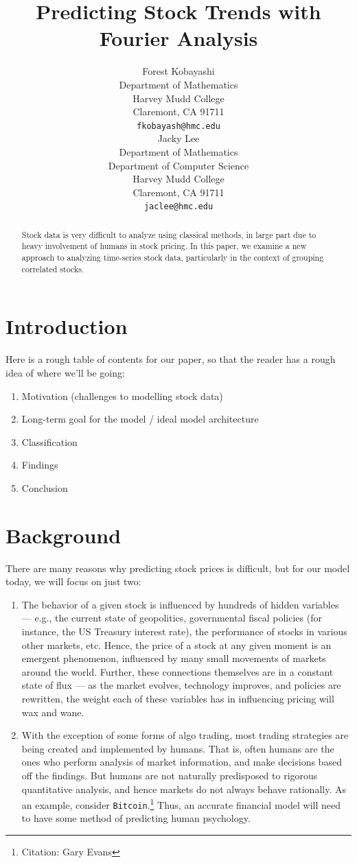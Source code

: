\documentclass[final]{article}
\title{Predicting Stock Trends with Fourier Analysis}
\author{
  Forest Kobayashi \\
  Department of Mathematics\\
  Harvey Mudd College\\
  Claremont, CA 91711 \\
  \texttt{fkobayash@hmc.edu} \\
  \And
  Jacky Lee \\
  Department of Mathematics\\
  Department of Computer Science \\
  Harvey Mudd College \\
  Claremont, CA 91711 \\
  \texttt{jaclee@hmc.edu}
}
\begin{document}

\maketitle

\begin{abstract}
  Stock data is very difficult to analyze using classical methods, in
  large part due to heavy involvement of humans in stock pricing. In
  this paper, we examine a new approach to analyzing time-series stock
  data, particularly in the context of grouping correlated stocks.
\end{abstract}

\section{Introduction}
Here is a rough table of contents for our paper, so that the reader
has a rough idea of where we'll be going:
\begin{enumerate}
  \item Motivation (challenges to modelling stock data)
  \item Long-term goal for the model / ideal model architecture
  \item Classification
  \item Findings
  \item Conclusion
\end{enumerate}

\section{Background}
There are many reasons why predicting stock prices is difficult, but
for our model today, we will focus on just two:
\begin{enumerate}
  \item The behavior of a given stock is influenced by hundreds of
    hidden variables --- e.g., the current state of geopolitics,
    governmental fiscal policies (for instance, the US Treasury
    interest rate), the performance of stocks in various other
    markets, etc. Hence, the price of a stock at any given moment is
    an emergent phenomenon, influenced by many small movements of
    markets around the world. Further, these connections themselves
    are in a constant state of flux --- as the market evolves,
    technology improves, and policies are rewritten, the weight each
    of these variables has in influencing pricing will wax and wane.
  \item With the exception of some forms of algo trading, most trading
    strategies are being created and implemented by humans. That is,
    often humans are the ones who perform analysis of market
    information, and make decisions based off the findings. But humans
    are not naturally predisposed to rigorous quantitative analysis,
    and hence markets do not always behave rationally. As an example,
    consider \texttt{Bitcoin}.\footnote{Citation: Gary Evans} Thus,
    an accurate financial model will need to have some method of
    predicting human psychology.
\end{enumerate}
\end{document}
